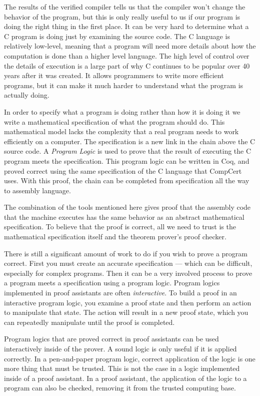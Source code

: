 \documentclass{puthesis}
\begin{document}
The results of the verified compiler tells us that the compiler won't
change the behavior of the program, but this is only really useful to
us if our program is doing the right thing in the first place. It can
be very hard to determine what a C program is doing just by examining
the source code. The C language is relatively
low-level, meaning that a program will need more details about how the
computation is done than a higher level language. The high level of
control over the details of execution is a large part of why C
continues to be popular over 40 years after it was created. It allows
programmers to write more efficient programs, but it can make it much
harder to understand what the program is actually doing.

In order to specify what a program is doing rather than how it is
doing it we write a mathematical specification of what the program
should do. This mathematical model lacks the complexity that a real
program needs to work efficiently on a computer.  The specification is
a new link in the chain above the C source code. A
\emph{Program Logic} is used to prove that the result of executing the
C program meets the specification. This program logic can be written
in Coq, and proved correct using the same specification of the C
language that CompCert uses. With this proof, the chain can be
completed from specification all the way to assembly language.

The combination of the tools mentioned here gives proof that the
assembly code that the machine executes has the same behavior as an
abstract mathematical specification. To believe that the proof is
correct, all we need to trust is the mathematical specification itself
and the theorem prover's proof checker.

There is still a significant amount of work to do if you wish to prove
a program correct. First you must create an accurate specification ---
which can be difficult, especially for complex programs. Then it can
be a very involved process to prove a program meets a specification
using a program logic. Program logics implemented in proof assistants
are often \emph{interactive}. To build a proof in an interactive
program logic, you examine a proof state and then perform an action to
manipulate that state. The action will result in a new proof state,
which you can repeatedly manipulate until the proof is completed.

Program logics that are proved correct in proof assistants can be used
interactively inside of the prover. A sound logic is only useful if it
is applied correctly. In a pen-and-paper program logic, correct
application of the logic is one more thing that must be trusted. This
is not the case in a logic implemented inside of a proof assistant. In
a proof assistant, the application of the logic to a program can also
be checked, removing it from the trusted computing base.
\end{document}
